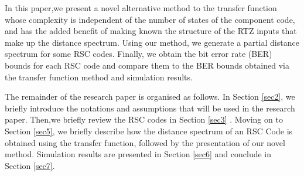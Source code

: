 
In this paper,we present a novel alternative method to the transfer function whose complexity is independent of the number of states of the component code, and has the added benefit of making known the structure of the RTZ inputs that make up the distance spectrum.
Using our method, we generate a partial distance spectrum for some RSC codes. Finally, we obtain the bit error rate (BER) bounds for each RSC code and compare them to the BER bounds obtained via the transfer function method and simulation results.

The remainder of the research paper is organised as follows. In Section \ref{sec2}, we briefly introduce the notations and assumptions that will be used in the research paper. Then,we briefly review the RSC codes in Section \ref{sec3} . Moving on to Section \ref{sec5}, 
we briefly describe how the distance spectrum of an RSC Code is obtained using the transfer function, followed by the presentation of our novel method. Simulation results are presented in Section \ref{sec6} and conclude in Section \ref{sec7}.